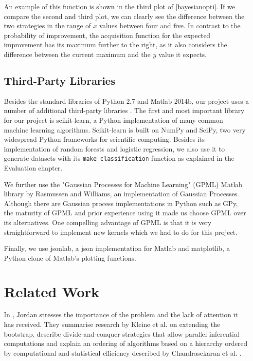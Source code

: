 \documentclass[a4paper,12pt,twoside,openright]{report}
\begin{document}
An example of this function is shown in the third plot of \ref{bayesianopti}. If we compare the second and third plot, we can clearly see the difference between the two strategies in the range of $x$ values between four and five. In contrast to the probability of improvement, the acquisition function for the expected improvement has its maximum further to the right, as it also considers the difference between the current maximum and the $y$ value it expects.

\section{Third-Party Libraries}
Besides the standard libraries of Python 2.7 and Matlab 2014b, our project uses a number of additional third-party libraries . The first and most important library for our project is scikit-learn, a Python implementation of many common machine learning algorithms. Scikit-learn is built on NumPy and SciPy, two very widespread Python frameworks for scientific computing. Besides its implementation of random forests and logistic regression, we also use it to generate datasets with its \texttt{make\_classification} function as explained in the Evaluation chapter.

We further use the "Gaussian Processes for Machine Learning" (GPML) Matlab library by Rasmussen and Williams, an implementation of Gaussian Processes. Although there are Gaussian process implementations in Python such as GPy, the maturity of GPML and prior experience using it made us choose GPML over its alternatives. One compelling advantage of GPML is that it is very straightforward to implement new kernels which we had to do for this project.

Finally, we use jsonlab, a json implementation for Matlab and matplotlib, a Python clone of Matlab's plotting functions.



\chapter{Related Work}


In \cite{jordan2013}, Jordan stresses the importance of the problem and the lack of attention it has received. They summarise research by Kleine et al. \cite{RSSB:RSSB12050} on extending the bootstrap, describe divide-and-conquer strategies that allow parallel inferential computations and explain an ordering of algorithms based on a hierarchy ordered by computational and statistical efficiency described by Chandrasekaran et al. \cite{Chandrasekaran26032013}.
\end{document}
